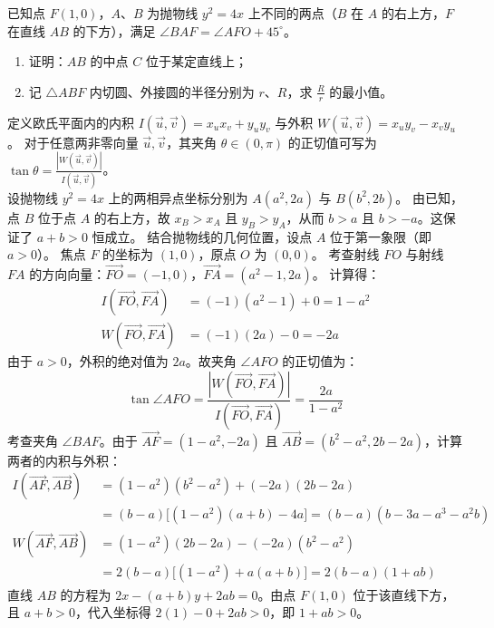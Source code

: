 \begin{example}
已知点 \(F(1,0)\)，\(A\)、\(B\) 为抛物线 \(y^2 = 4x\) 上不同的两点（\(B\) 在 \(A\) 的右上方，\(F\) 在直线 \(AB\) 的下方），满足 \(\angle BAF = \angle AFO + 45^\circ\)。
\begin{enumerate}
    \item[(1)] 证明：\(AB\) 的中点 \(C\) 位于某定直线上；
    \item[(2)] 记 \(\triangle ABF\) 内切圆、外接圆的半径分别为 \(r\)、\(R\)，求 \(\frac{R}{r}\) 的最小值。
\end{enumerate}
\end{example}
\begin{solution}
定义欧氏平面内的内积 $I(\vec{u}, \vec{v}) = x_u x_v + y_u y_v$ 与外积 $W(\vec{u}, \vec{v}) = x_u y_v - x_v y_u$。
对于任意两非零向量 $\vec{u}, \vec{v}$，其夹角 $\theta \in (0, \pi)$ 的正切值可写为 $\tan \theta = \frac{|W(\vec{u}, \vec{v})|}{I(\vec{u}, \vec{v})}$。\\
设抛物线 $y^2 = 4x$ 上的两相异点坐标分别为 $A(a^2, 2a)$ 与 $B(b^2, 2b)$。
由已知，点 $B$ 位于点 $A$ 的右上方，故 $x_B > x_A$ 且 $y_B > y_A$，从而 $b > a$ 且 $b > -a$。这保证了 $a+b > 0$ 恒成立。
结合抛物线的几何位置，设点 $A$ 位于第一象限（即 $a > 0$）。
焦点 $F$ 的坐标为 $(1,0)$，原点 $O$ 为 $(0,0)$。
考查射线 $FO$ 与射线 $FA$ 的方向向量：$\overrightarrow{FO} = (-1, 0)$，$\overrightarrow{FA} = (a^2-1, 2a)$。
计算得：
\begin{align*}
I(\overrightarrow{FO}, \overrightarrow{FA}) &= (-1)(a^2-1) + 0 = 1 - a^2 \\
W(\overrightarrow{FO}, \overrightarrow{FA}) &= (-1)(2a) - 0 = -2a
\end{align*}
由于 $a > 0$，外积的绝对值为 $2a$。故夹角 $\angle AFO$ 的正切值为：
\[ \tan \angle AFO = \frac{|W(\overrightarrow{FO}, \overrightarrow{FA})|}{I(\overrightarrow{FO}, \overrightarrow{FA})} = \frac{2a}{1 - a^2} \]
考查夹角 $\angle BAF$。由于 $\overrightarrow{AF} = (1-a^2, -2a)$ 且 $\overrightarrow{AB} = (b^2-a^2, 2b-2a)$，计算两者的内积与外积：
\begin{align*}
I(\overrightarrow{AF}, \overrightarrow{AB}) &= (1-a^2)(b^2-a^2) + (-2a)(2b-2a) \\
&= (b-a) \big[ (1-a^2)(a+b) - 4a \big] = (b-a)(b - 3a - a^3 - a^2 b) \\
W(\overrightarrow{AF}, \overrightarrow{AB}) &= (1-a^2)(2b-2a) - (-2a)(b^2-a^2) \\
&= 2(b-a) \big[ (1-a^2) + a(a+b) \big] = 2(b-a)(1+ab)
\end{align*}
直线 $AB$ 的方程为 $2x - (a+b)y + 2ab = 0$。由点 $F(1,0)$ 位于该直线下方，且 $a+b > 0$，代入坐标得 $2(1) - 0 + 2ab > 0$，即 $1+ab > 0$。

\end{solution}
